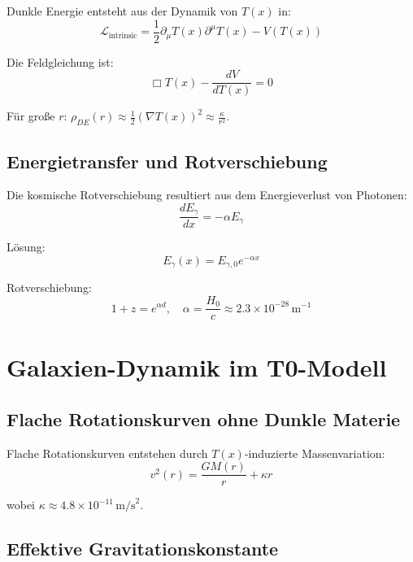 \documentclass[a4paper,12pt]{article}
\theoremstyle{definition}
\theoremstyle{remark}
\newcommand{\Tfield}{T(x)}
\begin{document}
	Dunkle Energie entsteht aus der Dynamik von \(\Tfield\) in:
	\begin{equation}
		\mathcal{L}_\text{intrinsic} = \frac{1}{2} \partial_\mu \Tfield \partial^\mu \Tfield - V(\Tfield)
	\end{equation}
	
	Die Feldgleichung ist:
	\begin{equation}
		\Box \Tfield - \frac{dV}{d\Tfield} = 0
	\end{equation}
	
	Für große \(r\): \(\rho_{DE}(r) \approx \frac{1}{2} (\nabla \Tfield)^2 \approx \frac{\kappa}{r^2}\).
	
	\subsection{Energietransfer und Rotverschiebung}
	
	Die kosmische Rotverschiebung resultiert aus dem Energieverlust von Photonen:
	\begin{equation}
		\frac{dE_{\gamma}}{dx} = -\alpha E_{\gamma}
	\end{equation}
	
	Lösung:
	\begin{equation}
		E_{\gamma}(x) = E_{\gamma,0} e^{-\alpha x}
	\end{equation}
	
	Rotverschiebung:
	\begin{equation}
		1 + z = e^{\alpha d}, \quad \alpha = \frac{H_0}{c} \approx 2.3 \times 10^{-28} \, \text{m}^{-1}
	\end{equation}
	
	\section{Galaxien-Dynamik im T0-Modell}
	
	\subsection{Flache Rotationskurven ohne Dunkle Materie}
	
	Flache Rotationskurven entstehen durch \(\Tfield\)-induzierte Massenvariation:
	\begin{equation}
		v^2(r) = \frac{G M(r)}{r} + \kappa r
	\end{equation}
	
	wobei \(\kappa \approx 4.8 \times 10^{-11} \, \text{m/s}^2\).
	
	\subsection{Effektive Gravitationskonstante}
	
\end{document}
